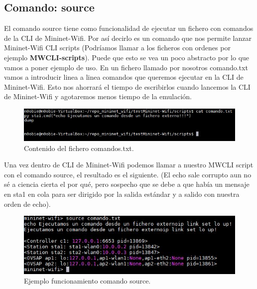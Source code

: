 \subsection{Comando: source}
El comando source tiene como funcionalidad de ejecutar un fichero con comandos de la CLI de Mininet-Wifi. Por así decirlo es un comando que nos permite lanzar Mininet-Wifi CLI scripts (Podríamos llamar a los ficheros con ordenes por ejemplo \textbf{MWCLI-scripts}). Puede que esto se vea un poco abstracto por lo que vamos a poner ejemplo de uso. En un fichero llamado por nosotros comando.txt vamos a introducir linea a linea comandos que queremos ejecutar en la CLI de Mininet-Wifi. Esto nos ahorrará el tiempo de escribirlos cuando lancemos la CLI de Mininet-Wifi  y agotaremos menos tiempo de la emulación.\newline
\begin{figure}[!htb]
  \centering
    \includegraphics[width=\linewidth]{./img/cli/10.JPG}
    \caption{Contenido del fichero comandos.txt.}
  \label{fig:yo}
\end{figure}
\newline
Una vez dentro de CLI de Mininet-Wifi podemos llamar a nuestro MWCLI script con el comando source, el resultado es el siguiente. (El echo sale corrupto aun no sé a ciencia cierta el por qué, pero sospecho que se debe a que había un mensaje en sta1 en cola para ser dirigido por la salida estándar y a salido con nuestra orden de echo).
\begin{figure}[!htb]
  \centering
    \includegraphics[width=\linewidth]{./img/cli/11.JPG}
    \caption{Ejemplo funcionamiento comando source.}
  \label{fig:yo}
\end{figure}
